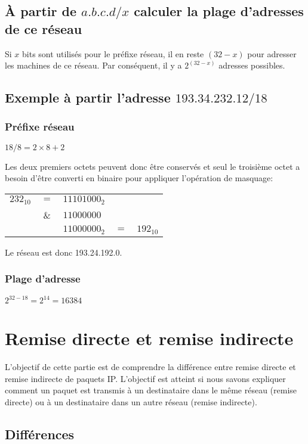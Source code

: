 \documentclass[11pt,a4paper]{article}
\begin{document}
\subsection{À partir de $a.b.c.d/x$ calculer la plage d'adresses de ce réseau}

Si $x$ bits sont utilisés pour le préfixe réseau, il en reste $(32-x)$ pour adresser les machines de ce réseau. Par conséquent, il y a $2^{(32-x)}$ adresses possibles.

\subsection{Exemple à partir l'adresse $193.34.232.12/18$}

\subsubsection*{Préfixe réseau}

$18 / 8 = 2 \times 8 + 2$

Les deux premiers octets peuvent donc être conservés et seul le troisième octet a besoin d'être converti en binaire pour appliquer l'opération de masquage:

\begin{tabular}{rclcl}
	$232_{10}$ & $=$ & $1110 1000_2$ \\
	& \& & $1100 0000$ \\
	\hline
	& & $1100 0000_2$ & $=$ & $192_{10}$
\end{tabular}

Le réseau est donc 193.24.192.0.

\subsubsection*{Plage d'adresse}

$2^{32-18} = 2^{14} = 16384$

\section{Remise directe et remise indirecte}

L'objectif de cette partie est de comprendre la différence entre remise directe et remise indirecte de paquets IP. L'objectif est atteint si nous savons expliquer comment un paquet est transmis à un destinataire dans le même réseau (remise directe) ou à un destinataire dans un autre réseau (remise indirecte).

\subsection{Différences}
\end{document}
